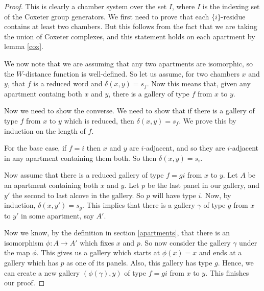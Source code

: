 \documentclass[11pt]{article}
\begin{document}
\begin{proof}
    This is clearly a chamber system over the set $I$, where $I$ is the indexing set of the Coxeter group generators. We first need to prove that each $\{i\}$-residue contains at least two chambers. But this follows from the fact that we are taking the union of Coxeter complexes, and this statement holds on each apartment by lemma \ref{cox}. 

    We now note that we are assuming that any two apartments are isomorphic, so the $W$-distance function is well-defined. So let us assume, for two chambers $x$ and $y$, that $f$ is a reduced word and $\delta(x,y)=s_f$. Now this means that, given any apartment containg both $x$ and $y$, there is a gallery of type $f$ from $x$ to $y$. 

    Now we need to show the converse. We need to show that if there is a gallery of type $f$ from $x$ to $y$ which is reduced, then $\delta(x,y)=s_f$. We prove this by induction on the length of $f$. 

    For the base case, if $f=i$ then $x$ and $y$ are $i$-adjacent, and so they are $i$-adjacent in any apartment containing them both. So then $\delta(x,y)=s_i$.

    Now assume that there is a reduced gallery of type $f=gi$ from $x$ to $y$. Let $A$ be an apartment containing both $x$ and $y$. Let $p$ be the last panel in our gallery, and $y'$ the second to last alcove in the gallery. So $p$ will have type $i$. Now, by induction, $\delta(x,y')=s_g$. This implies that there is a gallery $\gamma$ of type $g$ from $x$ to $y'$ in some apartment, say $A'$.
    
    Now we know, by the definition in section \ref{apartments}, that there is an isomorphism $\phi : A\to A'$ which fixes $x$ and $p$. So now consider the gallery $\gamma$ under the map $\phi$. This gives us a gallery which starts at $\phi(x)=x$ and ends at a gallery which has $p$ as one of its panels. Also, this gallery has type $g$. Hence, we can create a new gallery $(\phi(\gamma),y)$ of type $f=gi$ from $x$ to $y$. This finishes our proof.
\end{proof}
\end{document}
